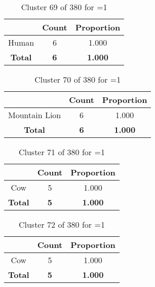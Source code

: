 \begin{table}[ht!]
\centering
\begin{tabular}{|c|c|c|}
\hline
\bf \Spec{} &\bf Count &\bf Proportion\\ \hline \hline
Human & 6 & 1.000\\ \hline
\hline
\bf Total & \bf 6 & \bf 1.000\\ \hline
\end{tabular}
\label{tab:cluster:69:1}
\caption{Cluster 69 of 380 for \minneigh{}=1}
\end{table}

\clearpage
\begin{table}[ht!]
\centering
\begin{tabular}{|c|c|c|}
\hline
\bf \Spec{} &\bf Count &\bf Proportion\\ \hline \hline
Mountain Lion & 6 & 1.000\\ \hline
\hline
\bf Total & \bf 6 & \bf 1.000\\ \hline
\end{tabular}
\label{tab:cluster:70:1}
\caption{Cluster 70 of 380 for \minneigh{}=1}
\end{table}

\begin{table}[ht!]
\centering
\begin{tabular}{|c|c|c|}
\hline
\bf \Spec{} &\bf Count &\bf Proportion\\ \hline \hline
Cow & 5 & 1.000\\ \hline
\hline
\bf Total & \bf 5 & \bf 1.000\\ \hline
\end{tabular}
\label{tab:cluster:71:1}
\caption{Cluster 71 of 380 for \minneigh{}=1}
\end{table}

\begin{table}[ht!]
\centering
\begin{tabular}{|c|c|c|}
\hline
\bf \Spec{} &\bf Count &\bf Proportion\\ \hline \hline
Cow & 5 & 1.000\\ \hline
\hline
\bf Total & \bf 5 & \bf 1.000\\ \hline
\end{tabular}
\label{tab:cluster:72:1}
\caption{Cluster 72 of 380 for \minneigh{}=1}
\end{table}

